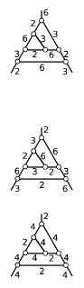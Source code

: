 \documentclass[suppldata, dvipdfmx]{interact}
\theoremstyle{plain}%
\theoremstyle{definition}
\theoremstyle{remark}
\theoremstyle{problemstyle}
\begin{document}
\begin{figure}[h!tbp]
  \begin{minipage}[t]{0.195\textwidth}
   \centering
   \includegraphics[width=0.8in, keepaspectratio]{./img/HexahedraWithSphericalFaces/hexahedralCake1/f.jpg}
   \label{fig:cake1f}
  \end{minipage}
 \\%
  \begin{minipage}[t]{0.195\textwidth}
   \centering
   \includegraphics[width=0.8in, keepaspectratio]{./img/HexahedraWithSphericalFaces/hexahedralCake1/h.jpg}
   \label{fig:cake1h}
  \end{minipage}
 \hspace*{\fill}
  \begin{minipage}[t]{0.195\textwidth}
   \centering
   \includegraphics[width=0.8in, keepaspectratio]{./img/HexahedraWithSphericalFaces/hexahedralCake1/j.jpg}

\end{minipage}
\end{figure}
\end{document}
